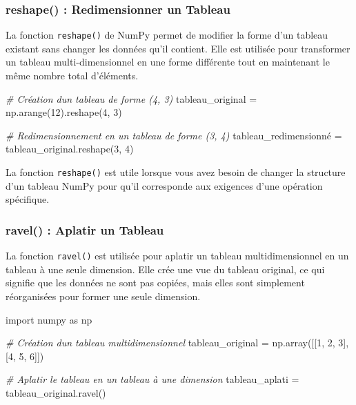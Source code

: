 \documentclass[11pt]{article}
\newenvironment{Shaded}{}{}
\newcommand{\DecValTok}[1]{\textcolor[rgb]{0.25,0.63,0.44}{{#1}}}
\newcommand{\CommentTok}[1]{\textcolor[rgb]{0.38,0.63,0.69}{\textit{{#1}}}}
\newcommand{\NormalTok}[1]{{#1}}
\newcommand{\ImportTok}[1]{{#1}}
\newcommand{\OperatorTok}[1]{\textcolor[rgb]{0.40,0.40,0.40}{{#1}}}
\begin{document}
\hypertarget{reshape-redimensionner-un-tableau}{%
\subsubsection{\texorpdfstring{\textbf{reshape() : Redimensionner un
Tableau}}{reshape() : Redimensionner un Tableau}}\label{reshape-redimensionner-un-tableau}}

La fonction \texttt{reshape()} de NumPy permet de modifier la forme d'un
tableau existant sans changer les données qu'il contient. Elle est
utilisée pour transformer un tableau multi-dimensionnel en une forme
différente tout en maintenant le même nombre total d'éléments.

\begin{Shaded}
\begin{Highlighting}[]

\CommentTok{\# Création d\textquotesingle{}un tableau de forme (4, 3)}
\NormalTok{tableau\_original }\OperatorTok{=}\NormalTok{ np.arange(}\DecValTok{12}\NormalTok{).reshape(}\DecValTok{4}\NormalTok{, }\DecValTok{3}\NormalTok{)}

\CommentTok{\# Redimensionnement en un tableau de forme (3, 4)}
\NormalTok{tableau\_redimensionné }\OperatorTok{=}\NormalTok{ tableau\_original.reshape(}\DecValTok{3}\NormalTok{, }\DecValTok{4}\NormalTok{)}
\end{Highlighting}
\end{Shaded}

La fonction \texttt{reshape()} est utile lorsque vous avez besoin de
changer la structure d'un tableau NumPy pour qu'il corresponde aux
exigences d'une opération spécifique.

\hypertarget{ravel-aplatir-un-tableau}{%
\subsubsection{\texorpdfstring{\textbf{ravel() : Aplatir un
Tableau}}{ravel() : Aplatir un Tableau}}\label{ravel-aplatir-un-tableau}}

La fonction \texttt{ravel()} est utilisée pour aplatir un tableau
multidimensionnel en un tableau à une seule dimension. Elle crée une vue
du tableau original, ce qui signifie que les données ne sont pas
copiées, mais elles sont simplement réorganisées pour former une seule
dimension.

\begin{Shaded}
\begin{Highlighting}[]
\ImportTok{import}\NormalTok{ numpy }\ImportTok{as}\NormalTok{ np}

\CommentTok{\# Création d\textquotesingle{}un tableau multidimensionnel}
\NormalTok{tableau\_original }\OperatorTok{=}\NormalTok{ np.array([[}\DecValTok{1}\NormalTok{, }\DecValTok{2}\NormalTok{, }\DecValTok{3}\NormalTok{], [}\DecValTok{4}\NormalTok{, }\DecValTok{5}\NormalTok{, }\DecValTok{6}\NormalTok{]])}

\CommentTok{\# Aplatir le tableau en un tableau à une dimension}
\NormalTok{tableau\_aplati }\OperatorTok{=}\NormalTok{ tableau\_original.ravel()}
\end{Highlighting}
\end{Shaded}
\end{document}
